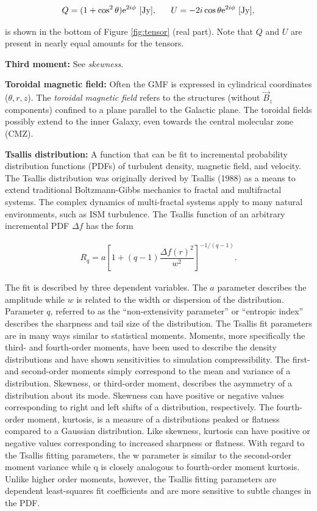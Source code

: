 \documentclass[a4paper,10pt]{article}
\begin{document}
\begin{align*}
    Q=(1+\cos^2\theta)\mathrm{e}^{2i\phi}~[{\rm Jy}], ~~~~~U=-2i\cos\theta\mathrm{e}^{2i\phi}~[{\rm Jy}],
\end{align*}

{\noindent}is shown in the bottom of Figure \ref{fig:tensor} (real part). Note that $Q$ and $U$ are present in nearly equal amounts for the tensors.

{\noindent}\textbf{Third moment:} See \textit{skewness}.

{\noindent}\textbf{Toroidal magnetic field:} Often the GMF is expressed in cylindrical coordinates ($\theta, r, z$). The \textit{toroidal magnetic field} refers to the structures (without $\vec{B}_z$ components) confined to a plane parallel to the Galactic plane. The toroidal fields possibly extend to the inner Galaxy, even towards the central molecular zone (CMZ).

{\noindent}\textbf{Tsallis distribution:} A function that can be fit to incremental probability distribution functions (PDFs) of turbulent density, magnetic field, and velocity. The Tsallis distribution was originally derived by Tsallis (1988) as a means to extend traditional Boltzmann-Gibbs mechanics to fractal and multifractal systems. The complex dynamics of multi-fractal systems apply to many natural environments, such as ISM turbulence. The Tsallis function of an arbitrary incremental PDF $\Delta f$ has the form

\begin{align*}
    R_q = a \left[ 1+(q-1) \dfrac{\Delta f(r)^2}{w^2} \right]^{-1/(q-1)}.
\end{align*}

{\noindent}The fit is described by three dependent variables. The $a$ parameter describes the amplitude while $w$ is related to the width or dispersion of the distribution. Parameter $q$, referred to as the ``non-extensivity parameter'' or ``entropic index'' describes the sharpness and tail size of the distribution. The Tsallis fit parameters are in many ways similar to statistical moments. Moments, more specifically the third- and fourth-order moments, have been used to describe the density distributions and have shown sensitivities to simulation compressibility. The first- and second-order moments simply correspond to the mean and variance of a distribution. Skewness, or third-order moment, describes the asymmetry of a distribution about its mode. Skewness can have positive or negative values corresponding to right and left shifts of a distribution, respectively. The fourth-order moment, kurtosis, is a measure of a distributions peaked or flatness compared to a Gaussian distribution. Like skewness, kurtosis can have positive or negative values corresponding to increased sharpness or flatness. With regard to the Tsallis fitting parameters, the w parameter is similar to the second-order moment variance while q is closely analogous to fourth-order moment kurtosis. Unlike higher order moments, however, the Tsallis fitting parameters are dependent least-squares fit coefficients and are more sensitive to subtle changes in the PDF.
\end{document}
